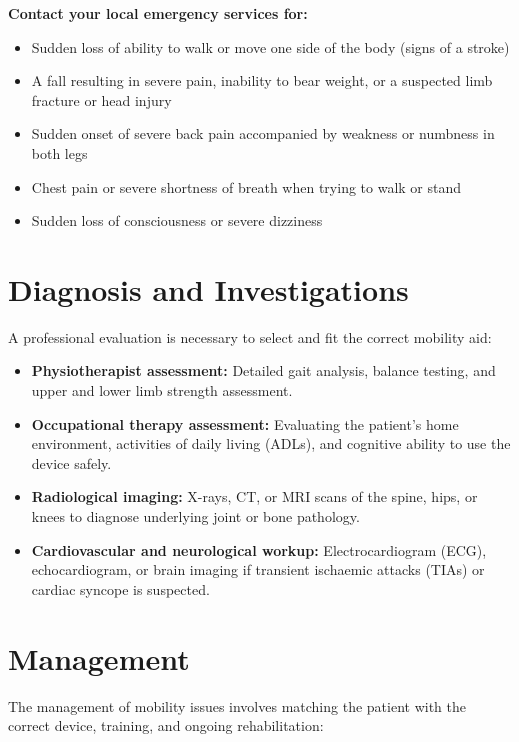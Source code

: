 \textbf{Contact your local emergency services for:}
\begin{itemize}
    \item Sudden loss of ability to walk or move one side of the body (signs of a stroke)
    \item A fall resulting in severe pain, inability to bear weight, or a suspected limb fracture or head injury
    \item Sudden onset of severe back pain accompanied by weakness or numbness in both legs
    \item Chest pain or severe shortness of breath when trying to walk or stand
    \item Sudden loss of consciousness or severe dizziness
\end{itemize}

\section*{Diagnosis and Investigations}
A professional evaluation is necessary to select and fit the correct mobility aid:

\begin{itemize}
    \item \textbf{Physiotherapist assessment:} Detailed gait analysis, balance testing, and upper and lower limb strength assessment.
    \item \textbf{Occupational therapy assessment:} Evaluating the patient's home environment, activities of daily living (ADLs), and cognitive ability to use the device safely.
    \item \textbf{Radiological imaging:} X-rays, CT, or MRI scans of the spine, hips, or knees to diagnose underlying joint or bone pathology.
    \item \textbf{Cardiovascular and neurological workup:} Electrocardiogram (ECG), echocardiogram, or brain imaging if transient ischaemic attacks (TIAs) or cardiac syncope is suspected.
\end{itemize}

\section*{Management}
The management of mobility issues involves matching the patient with the correct device, training, and ongoing rehabilitation:

